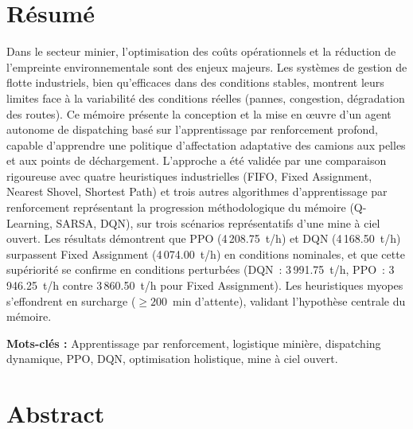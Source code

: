 \documentclass[11pt,a4paper]{report}
\begin{document}
\newpage

\chapter*{Résumé}

Dans le secteur minier, l’optimisation des coûts opérationnels et la réduction de l’empreinte environnementale sont des enjeux majeurs. Les systèmes de gestion de flotte industriels, bien qu’efficaces dans des conditions stables, montrent leurs limites face à la variabilité des conditions réelles (pannes, congestion, dégradation des routes). Ce mémoire présente la conception et la mise en œuvre d’un agent autonome de dispatching basé sur l’apprentissage par renforcement profond, capable d’apprendre une politique d’affectation adaptative des camions aux pelles et aux points de déchargement. L’approche a été validée par une comparaison rigoureuse avec quatre heuristiques industrielles (FIFO, Fixed Assignment, Nearest Shovel, Shortest Path) et trois autres algorithmes d’apprentissage par renforcement représentant la progression méthodologique du mémoire (Q-Learning, SARSA, DQN), sur trois scénarios représentatifs d’une mine à ciel ouvert. Les résultats démontrent que PPO (4\,208.75~t/h) et DQN (4\,168.50~t/h) surpassent Fixed Assignment (4\,074.00~t/h) en conditions nominales, et que cette supériorité se confirme en conditions perturbées (DQN~: 3\,991.75~t/h, PPO~: 3\,946.25~t/h contre 3\,860.50~t/h pour Fixed Assignment). Les heuristiques myopes s’effondrent en surcharge ($\geq 200$~min d’attente), validant l’hypothèse centrale du mémoire.

\vspace{1cm}
\noindent\textbf{Mots-clés :} Apprentissage par renforcement, logistique minière, dispatching dynamique, PPO, DQN, optimisation holistique, mine à ciel ouvert.

\newpage

\chapter*{Abstract}
\end{document}
